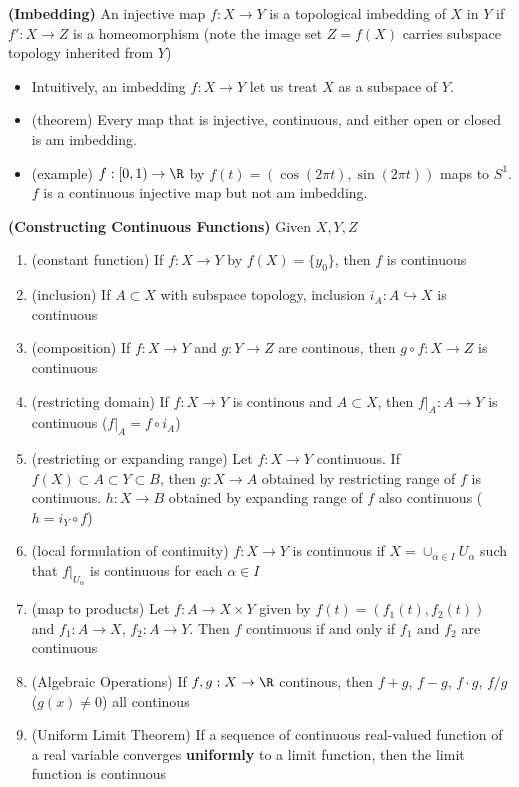 \documentclass[10.5pt]{article}
\begin{document}
\begin{defn*}
    \textbf{(Imbedding)} An injective map $f:X\to Y$ is a topological imbedding of $X$ in $Y$ if $f':X\to Z$ is a homeomorphism (note the image set $Z = f(X)$ carries subspace topology inherited from $Y$)
    \begin{itemize}
        \item Intuitively, an imbedding $f:X\to Y$ let us treat $X$ as a subspace of $Y$.
        \item (theorem) Every map that is injective, continuous, and either open or closed is am imbedding.
        \item (example) $f:[0,1) \to \R$ by $f(t) = (\cos(2\pi t), \sin(2\pi t))$ maps to $S^1$. $f$ is a continuous injective map but not am imbedding.
    \end{itemize}
\end{defn*}


\begin{theorem*}
    \textbf{(Constructing Continuous Functions)} Given $X,Y,Z$
    \begin{enumerate}
        \item (constant function) If $f:X\to Y$ by $f(X) = \{y_0\}$, then $f$ is continuous
        \item (inclusion) If $A\subset X$ with subspace topology, inclusion $i_A:A\hookrightarrow X$ is continuous
        \item (composition) If $f:X\to Y$ and $g:Y\to Z$ are continous, then $g\circ f: X\to Z$ is continuous
        \item (restricting domain) If $f:X\to Y$ is continous and $A\subset X$, then $f|_A : A\to Y$ is continuous ($f|_A = f \circ i_A$)
        \item (restricting or expanding range) Let $f:X\to Y$ continuous. If $f(X)\subset A\subset Y \subset B$, then $g:X\to A$ obtained by restricting range of $f$ is continuous. $h:X\to B$ obtained by expanding range of $f$ also continuous ($h = i_Y \circ f$)
        \item (local formulation of continuity) $f:X\to Y$ is continuous if $X = \cup_{\alpha\in I} U_{\alpha}$ such that $f|_{U_{\alpha}}$ is continuous for each $\alpha \in I$
        \item (map to products) Let $f:A\to X\times Y$ given by $f(t) = (f_1(t), f_2(t))$ and $f_1:A\to X$, $f_2:A\to Y$. Then $f$ continuous if and only if $f_1$ and $f_2$ are continuous
        \item (Algebraic Operations) If $f,g:X\to \R$ continous, then $f+g$, $f-g$, $f \cdot g$, $f/g$ ($g(x) \neq 0$) all continous 
        \item (Uniform Limit Theorem) If a sequence of continuous real-valued function of a real variable converges \textbf{uniformly} to a limit function, then the limit function is continuous 
    \end{enumerate}
\end{theorem*}
\end{document}
